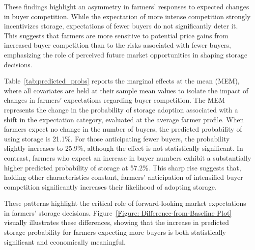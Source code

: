 These findings highlight an asymmetry in farmers’ responses to expected changes in buyer competition. While the expectation of more intense competition strongly incentivizes storage, expectations of fewer buyers do not significantly deter it. This suggests that farmers are more sensitive to potential price gains from increased buyer competition than to the risks associated with fewer buyers, emphasizing the role of perceived future market opportunities in shaping storage decisions.

Table~\ref{tab:predicted_probs} reports the marginal effects at the mean (MEM), where all covariates are held at their sample mean values to isolate the impact of changes in farmers' expectations regarding buyer competition. The MEM represents the change in the probability of storage adoption associated with a shift in the expectation category, evaluated at the average farmer profile. When farmers expect no change in the number of buyers, the predicted probability of using storage is 21.1\%. For those anticipating fewer buyers, the probability slightly increases to 25.9\%, although the effect is not statistically significant. In contrast, farmers who expect an increase in buyer numbers exhibit a substantially higher predicted probability of storage at 57.2\%. This sharp rise suggests that, holding other characteristics constant, farmers' anticipation of intensified buyer competition significantly increases their likelihood of adopting storage.

These patterns highlight the critical role of forward-looking market expectations in farmers’ storage decisions. Figure~\ref{Figure: Difference-from-Baseline Plot} visually illustrates these differences, showing that the increase in predicted storage probability for farmers expecting more buyers is both statistically significant and economically meaningful.




